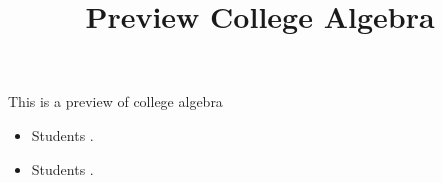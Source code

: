 \documentclass{ximera}
\title{Preview College Algebra}
\begin{document}
\begin{abstract}
\end{abstract}

\maketitle

\begin{sectionOutcomes}

This is a preview of college algebra

\begin{itemize}
\item Students .
\item Students .
\end{itemize}

\end{sectionOutcomes}
\end{document}
